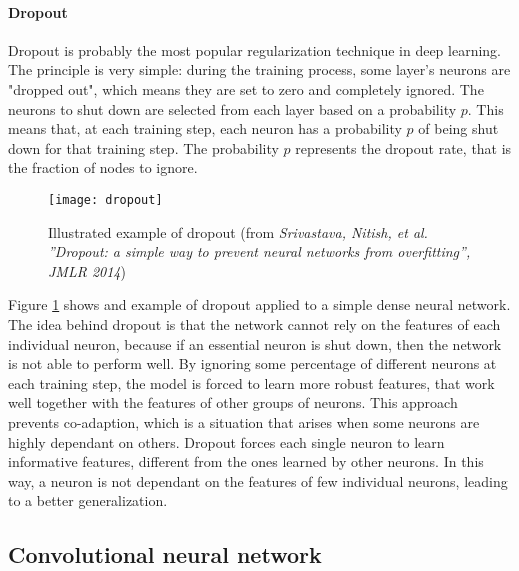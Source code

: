 \paragraph{Dropout} Dropout is probably the most popular regularization technique in deep learning. The principle is very simple: during the training process, some layer's neurons are "dropped out", which means they are set to zero and completely ignored. The neurons to shut down are selected from each layer based on a probability $p$. This means that, at each training step, each neuron has a probability $p$ of being shut down for that training step. The probability $p$ represents the dropout rate, that is the fraction of nodes to ignore.
\begin{figure}[htbp]
    \centering
    \texttt{[image: dropout]}
    \caption{Illustrated example of dropout (from \textit{Srivastava, Nitish, et al. ”Dropout: a simple way to prevent neural networks from overfitting”, JMLR 2014})}
    \label{fig:dropout}
\end{figure}

Figure \ref{fig:dropout} shows and example of dropout applied to a simple dense neural network. The idea behind dropout is that the network cannot rely on the features of each individual neuron, because if an essential neuron is shut down, then the network is not able to perform well. By ignoring some percentage of different neurons at each training step, the model is forced to learn more robust features, that work well together with the features of other groups of neurons. This approach prevents co-adaption, which is a situation that arises when some neurons are highly dependant on others. Dropout forces each single neuron to learn informative features, different from the ones learned by other neurons. In this way, a neuron is not dependant on the features of few individual neurons, leading to a better generalization.


\subsection{Convolutional neural network}
